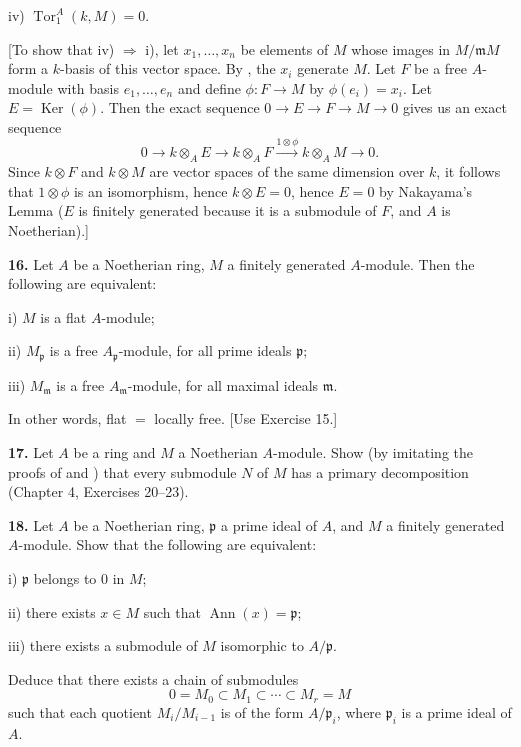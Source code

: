 iv) $\operatorname{Tor}_1^A(k,M)=0$.

[To show that iv) $\Rightarrow$ i), let $x_1,\ldots,x_n$ be elements of $M$ whose images in $M/\mathfrak mM$
form a $k$-basis of this vector space.  By , the $x_i$ generate $M$.  Let $F$ be a free
$A$-module with basis $e_1,\ldots,e_n$ and define $\phi:F\longrightarrow M$ by $\phi(e_i)=x_i$.  Let $E=\operatorname{Ker}
(\phi)$.  Then the exact sequence $0\longrightarrow E\longrightarrow F\longrightarrow M\longrightarrow0$ gives us an exact sequence
\[
0\longrightarrow k\otimes_A E\longrightarrow k\otimes_A F\xrightarrow{1\otimes\phi}k\otimes_A M\longrightarrow0.
\]
Since $k\otimes F$ and $k\otimes M$ are vector spaces of the same dimension over $k$, it
follows that $1\otimes\phi$ is an isomorphism, hence $k\otimes E=0$, hence $E=0$ by
Nakayama's Lemma ($E$ is finitely generated because it is a submodule of $F$, and $A$
is Noetherian).]

\medskip
\noindent\textbf{16.} Let $A$ be a Noetherian ring, $M$ a finitely generated $A$-module.  Then the following
are equivalent:

i) $M$ is a flat $A$-module;

ii) $M_\mathfrak p$ is a free $A_\mathfrak p$-module, for all prime ideals $\mathfrak p$;

iii) $M_\mathfrak m$ is a free $A_\mathfrak m$-module, for all maximal ideals $\mathfrak m$.

In other words, flat $={}$ locally free.  [Use Exercise 15.]

\medskip
\noindent\textbf{17.} Let $A$ be a ring and $M$ a Noetherian $A$-module.  Show (by imitating the proofs
of  and ) that every submodule $N$ of $M$ has a primary decomposition
(Chapter 4, Exercises 20--23).

\medskip
\noindent\textbf{18.} Let $A$ be a Noetherian ring, $\mathfrak p$ a prime ideal of $A$, and $M$ a finitely generated
$A$-module.  Show that the following are equivalent:

i) $\mathfrak p$ belongs to 0 in $M$;

ii) there exists $x\in M$ such that $\operatorname{Ann}(x)=\mathfrak p$;

iii) there exists a submodule of $M$ isomorphic to $A/\mathfrak p$.

Deduce that there exists a chain of submodules
\[
0=M_0\subset M_1\subset\cdots\subset M_r=M
\]
such that each quotient $M_i/M_{i-1}$ is of the form $A/\mathfrak p_i$, where $\mathfrak p_i$ is a prime ideal
of $A$.

